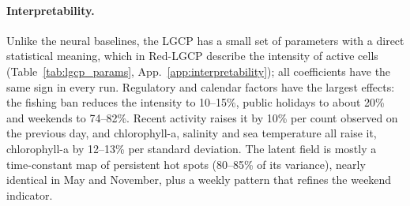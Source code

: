 \paragraph{Interpretability.}
Unlike the neural baselines, the LGCP has a small set of parameters with a direct statistical meaning, which in Red-LGCP describe the intensity of active cells (Table~\ref{tab:lgcp_params}, App.~\ref{app:interpretability}); all coefficients have the same sign in every run. Regulatory and calendar factors have the largest effects: the fishing ban reduces the intensity to 10--15\%, public holidays to about 20\% and weekends to 74--82\%. Recent activity raises it by 10\% per count observed on the previous day, and chlorophyll-a, salinity and sea temperature all raise it, chlorophyll-a by 12--13\% per standard deviation. The latent field is mostly a time-constant map of persistent hot spots (80--85\% of its variance), nearly identical in May and November, plus a weekly pattern that refines the weekend indicator.
